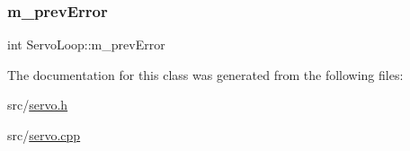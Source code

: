 \mbox{\label{class_servo_loop_ac7999e3741b4ede946a41f512002ca92}} 
\subsubsection{\texorpdfstring{m\+\_\+prev\+Error}{m\_prevError}}
{\footnotesize\ttfamily int Servo\+Loop\+::m\+\_\+prev\+Error}



The documentation for this class was generated from the following files\+:\begin{DoxyCompactItemize}
\item 
src/\mbox{\hyperlink{servo_8h}{servo.\+h}}\item 
src/\mbox{\hyperlink{servo_8cpp}{servo.\+cpp}}\end{DoxyCompactItemize}
